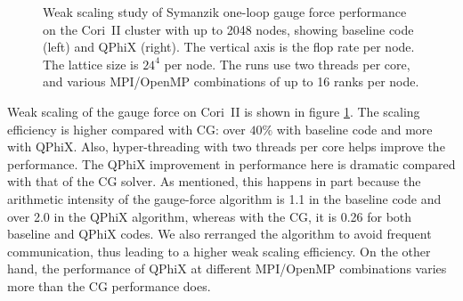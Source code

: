 \documentclass[epj]{webofc}
\begin{document}
\begin{figure}[tp]
   \centering
    \hspace{1cm} 
   \caption{Weak scaling study of Symanzik one-loop gauge force performance on the Cori~II cluster with up to 2048 nodes, showing baseline code (left) and QPhiX (right). 
   The vertical axis is the flop rate per node. The lattice size is $24^4$ per node. 
   The runs use two threads per core, and various MPI/OpenMP combinations of up to 16 ranks per node.
   }
   \label{Fig.7}
\end{figure}

\noindent{}Weak scaling of the gauge force
on Cori~II is shown in figure \ref{Fig.7}. 
The scaling efficiency is higher compared with CG: 
over $40\%$ with baseline code and more with QPhiX. 
Also, hyper-threading with two threads per core helps improve the performance. 
The QPhiX improvement in performance here is dramatic compared with that of the CG solver. 
As mentioned, this happens in part because the arithmetic intensity of the gauge-force algorithm is 1.1 in the baseline code 
and over 2.0 in the QPhiX algorithm, 
whereas with the CG, 
it is 0.26 for both baseline and QPhiX codes.  
We also rerranged the algorithm
to avoid frequent communication,
thus leading to a higher weak scaling efficiency.
On the other hand, 
the performance of QPhiX at different MPI/OpenMP combinations varies more than the CG performance does. 
\end{document}

